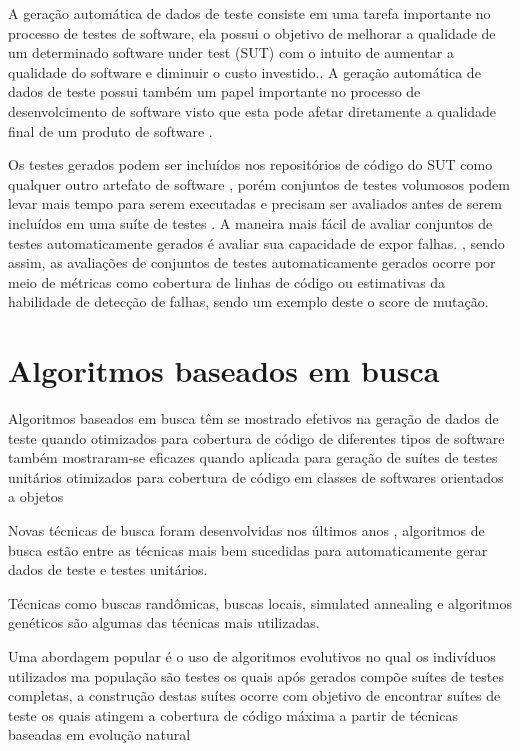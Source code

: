 \documentclass[
	12pt,				%
	oneside,			%
	a4paper,			%
	english,			%
	brazil				%
	]{abntex2ppgsi}
\begin{document}
A geração automática de dados de teste consiste em uma tarefa importante no processo de testes de software, ela possui o objetivo de melhorar a qualidade de um determinado software under test (SUT) com o intuito de aumentar a qualidade do software e diminuir o custo investido.\cite{shamriski20151115}. A geração automática de dados de teste possui também um papel importante no processo de desenvolcimento de software visto que esta pode afetar diretamente a qualidade final de um produto de software \cite{dave2015}.

Os testes gerados podem ser incluídos nos repositórios de código do SUT como qualquer outro artefato de software \cite{shamshiri2018}, porém conjuntos de testes volumosos podem levar mais tempo para serem executadas e precisam ser avaliados antes de serem incluídos em uma suíte de testes \cite{shamriski20151115}. A maneira mais fácil de avaliar conjuntos de testes automaticamente gerados é avaliar sua capacidade de expor falhas. \cite{shamshiri2018}, sendo assim, as avaliações de conjuntos de testes automaticamente gerados ocorre por meio de métricas como cobertura de linhas de código ou estimativas da habilidade de detecção de falhas, sendo um exemplo deste o score de mutação. \cite{shamshiri2018}


\section{Algoritmos baseados em busca}
Algoritmos baseados em busca têm se mostrado efetivos na geração de dados de teste quando otimizados para cobertura de código de diferentes tipos de software \cite{Campos2017} também mostraram-se eficazes quando aplicada para geração de suítes de testes unitários otimizados para cobertura de código em classes de softwares orientados a objetos\cite{Campos2017}

Novas técnicas de busca foram desenvolvidas nos últimos anos \cite{rojas2017b}, algoritmos de busca estão entre as técnicas mais bem sucedidas para automaticamente gerar dados de teste e testes unitários. \cite{rojas2017b}

Técnicas como buscas randômicas, buscas locais, simulated annealing e algoritmos genéticos são algumas das técnicas mais utilizadas. \cite{rojas2017b}

Uma abordagem popular é o uso de algoritmos evolutivos no qual os indivíduos utilizados ma população são testes os quais  após gerados compõe suítes de testes completas, a construção destas suítes ocorre com objetivo de encontrar suítes de teste os quais atingem a cobertura de código máxima a partir de técnicas baseadas em evolução natural \cite{Campos2017}
\end{document}
